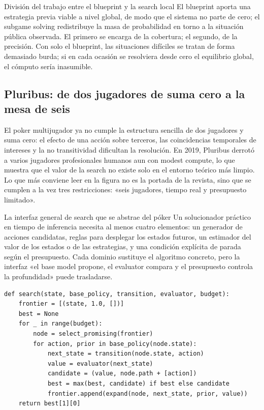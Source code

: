 \begin{importantbox}{División del trabajo entre el blueprint y la search local}
El blueprint aporta una estrategia previa viable a nivel global, de modo que el sistema no parte de cero; el subgame solving redistribuye la masa de probabilidad en torno a la situación pública observada. El primero se encarga de la cobertura; el segundo, de la precisión. Con solo el blueprint, las situaciones difíciles se tratan de forma demasiado burda; si en cada ocasión se resolviera desde cero el equilibrio global, el cómputo sería inasumible.
\end{importantbox}

\subsection{Pluribus: de dos jugadores de suma cero a la mesa de seis}

El poker multijugador ya no cumple la estructura sencilla de dos jugadores y suma cero: el efecto de una acción sobre terceros, las coincidencias temporales de intereses y la no transitividad dificultan la resolución. En 2019, Pluribus derrotó a varios jugadores profesionales humanos aun con modest compute, lo que muestra que el valor de la search no existe solo en el entorno teórico más limpio. Lo que más conviene leer en la figura no es la portada de la revista, sino que se cumplen a la vez tres restricciones: «seis jugadores, tiempo real y presupuesto limitado».


\begin{knowledgebox}{La interfaz general de search que se abstrae del póker}
Un solucionador práctico en tiempo de inferencia necesita al menos cuatro elementos: un generador de acciones candidatas, reglas para desplegar los estados futuros, un estimador del valor de los estados o de las estrategias, y una condición explícita de parada según el presupuesto. Cada dominio sustituye el algoritmo concreto, pero la interfaz «el base model propone, el evaluator compara y el presupuesto controla la profundidad» puede trasladarse.
\end{knowledgebox}

\begin{lstlisting}[caption={Esqueleto independiente del dominio de la budgeted inference-time search},label={lst:budgeted-search}]
def search(state, base_policy, transition, evaluator, budget):
    frontier = [(state, 1.0, [])]
    best = None
    for _ in range(budget):
        node = select_promising(frontier)
        for action, prior in base_policy(node.state):
            next_state = transition(node.state, action)
            value = evaluator(next_state)
            candidate = (value, node.path + [action])
            best = max(best, candidate) if best else candidate
            frontier.append(expand(node, next_state, prior, value))
    return best[1][0]
\end{lstlisting}

